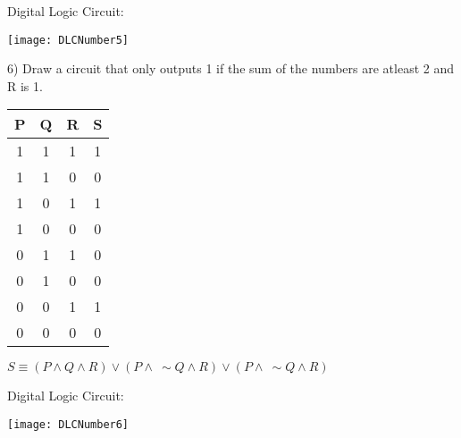\documentclass[11pt]{article}
\begin{document}
\begin{flushleft}
	
	Digital Logic Circuit:
	\begin{center}
	\texttt{[image: DLCNumber5]}
	\end{center}
		
	6) Draw a circuit that only outputs 1 if the sum of the numbers are atleast 2 and R is 1.	
	
	\begin{center}
	\begin{tabular}{|ccc|c|}\hline
	P&Q&R&S \\ \hline
	1&1&1&1 \\ 
	1&1&0&0 \\
	1&0&1&1 \\ 
	1&0&0&0 \\ 
	0&1&1&0 \\ 
	0&1&0&0 \\ 
	0&0&1&1 \\ 
	0&0&0&0 \\ \hline
	\end{tabular}
	$S \equiv (P\land Q\land R)\lor (P\land \ \sim Q\land R)\lor (P\land \ \sim Q\land R) $
	\end{center}
	
	Digital Logic Circuit:
	\begin{center}
	\texttt{[image: DLCNumber6]}
	\end{center}	
	
	
	\end{flushleft}
\end{document}
